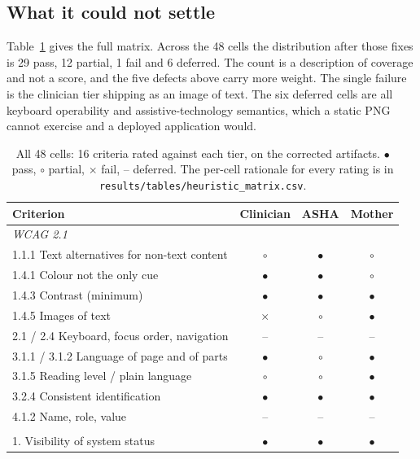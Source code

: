 \subsection{What it could not settle}

Table~\ref{tab:matrix} gives the full matrix. Across the 48 cells the
distribution after those fixes is 29 pass, 12 partial, 1 fail and 6 deferred.
The count is a description of coverage and not a score, and the five defects
above carry more weight. The single failure is the clinician tier shipping as
an image of text. The six deferred cells are all keyboard operability and
assistive-technology semantics, which a static PNG cannot exercise and a
deployed application would.

\begin{table}[t]
\centering
\footnotesize
\caption{All 48 cells: 16 criteria rated against each tier, on the corrected
artifacts. $\bullet$ pass, $\circ$ partial, $\times$ fail, -- deferred. The
per-cell rationale for every rating is in
\texttt{results/tables/heuristic\_matrix.csv}.}
\label{tab:matrix}
\begin{tabular}{lccc}
\toprule
Criterion & Clinician & ASHA & Mother \\
\midrule
\multicolumn{4}{l}{\emph{WCAG 2.1}} \\
1.1.1 Text alternatives for non-text content & $\circ$ & $\bullet$ & $\circ$ \\
1.4.1 Colour not the only cue                & $\bullet$ & $\bullet$ & $\circ$ \\
1.4.3 Contrast (minimum)                     & $\bullet$ & $\bullet$ & $\bullet$ \\
1.4.5 Images of text                         & $\times$ & $\circ$ & $\bullet$ \\
2.1 / 2.4 Keyboard, focus order, navigation  & -- & -- & -- \\
3.1.1 / 3.1.2 Language of page and of parts  & $\bullet$ & $\circ$ & $\bullet$ \\
3.1.5 Reading level / plain language         & $\circ$ & $\circ$ & $\bullet$ \\
3.2.4 Consistent identification              & $\bullet$ & $\bullet$ & $\bullet$ \\
4.1.2 Name, role, value                      & -- & -- & -- \\
\addlinespace
\multicolumn{4}{l}{\emph{Nielsen's heuristics}} \\
1. Visibility of system status               & $\bullet$ & $\bullet$ & $\bullet$ \\

\end{tabular}
\end{table}
